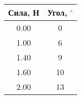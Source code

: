 \begin{tabular}{|c|c|}
\hline
Сила, Н & Угол, $^\circ$ \\ \hline
0.00 & 0 \\ \hline
1.00 & 6 \\ \hline
1.40 & 9 \\ \hline
1.60 & 10 \\ \hline
2.00 & 13 \\ \hline
\end{tabular}
